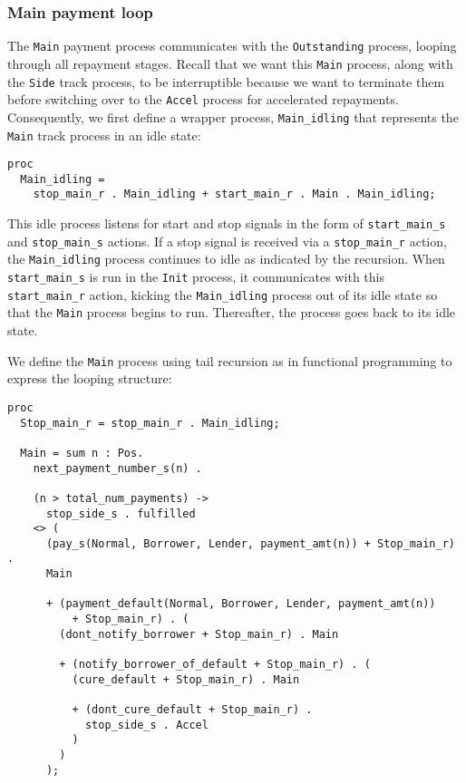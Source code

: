 \documentclass{article}
\begin{document}

\subsubsection{Main payment loop}

The \texttt{Main} payment process communicates with the \texttt{Outstanding}
process, looping through all repayment stages.
Recall that we want this \texttt{Main} process, along with the \texttt{Side}
track process, to be interruptible because we want to terminate them
before switching over to the \texttt{Accel} process for accelerated repayments.
Consequently, we first define a wrapper process, \texttt{Main\_idling} that
represents the \texttt{Main} track process in an idle state:

\begin{lstlisting}
proc
  Main_idling =
    stop_main_r . Main_idling + start_main_r . Main . Main_idling;
\end{lstlisting}

This idle process listens for start and stop signals in the form of
\texttt{start\_main\_s} and \texttt{stop\_main\_s} actions.
If a stop signal is received via a \texttt{stop\_main\_r} action,
the \texttt{Main\_idling} process continues to idle as indicated by the
recursion.
When \texttt{start\_main\_s} is run in the \texttt{Init} process, it
communicates with this \texttt{start\_main\_r} action, kicking the
\texttt{Main\_idling} process out of its idle state so that the
\texttt{Main} process begins to run.
Thereafter, the process goes back to its idle state.

We define the \texttt{Main} process using tail recursion as in
functional programming to express the looping structure:

\begin{lstlisting}
proc
  Stop_main_r = stop_main_r . Main_idling;

  Main = sum n : Pos.
    next_payment_number_s(n) .

    (n > total_num_payments) -> 
      stop_side_s . fulfilled
    <> (
      (pay_s(Normal, Borrower, Lender, payment_amt(n)) + Stop_main_r) .
      Main

      + (payment_default(Normal, Borrower, Lender, payment_amt(n))
          + Stop_main_r) . (
        (dont_notify_borrower + Stop_main_r) . Main

        + (notify_borrower_of_default + Stop_main_r) . (
          (cure_default + Stop_main_r) . Main

          + (dont_cure_default + Stop_main_r) .
            stop_side_s . Accel
          )
        )
      );
\end{lstlisting}
\end{document}
